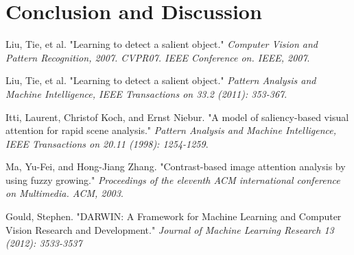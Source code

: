 \documentclass[10pt,twocolumn,letterpaper]{article}
\begin{document}
\section{Conclusion and Discussion}

\begin{thebibliography}{99} \fontsize{9pt}{50} \setlength{\itemsep}{-0.5pt} 
     Liu, Tie, et al. "Learning to detect a salient object." 
        \textit{Computer Vision and Pattern Recognition, 2007. CVPR07. IEEE Conference on. IEEE, 2007}.

     Liu, Tie, et al. "Learning to detect a salient object." 
        \textit{Pattern Analysis and Machine Intelligence, IEEE Transactions on 33.2 (2011): 353-367}. 

     Itti, Laurent, Christof Koch, and Ernst Niebur. "A model of saliency-based visual attention for rapid scene analysis."
        \textit{Pattern Analysis and Machine Intelligence, IEEE Transactions on 20.11 (1998): 1254-1259}.

     Ma, Yu-Fei, and Hong-Jiang Zhang. "Contrast-based image attention analysis by using fuzzy growing."
        \textit{ Proceedings of the eleventh ACM international conference on Multimedia. ACM, 2003}. 

     Gould, Stephen. "DARWIN: A Framework for Machine Learning and Computer Vision Research and Development." 
        \textit{Journal of Machine Learning Research 13 (2012): 3533-3537}

\end{thebibliography}
\end{document}
